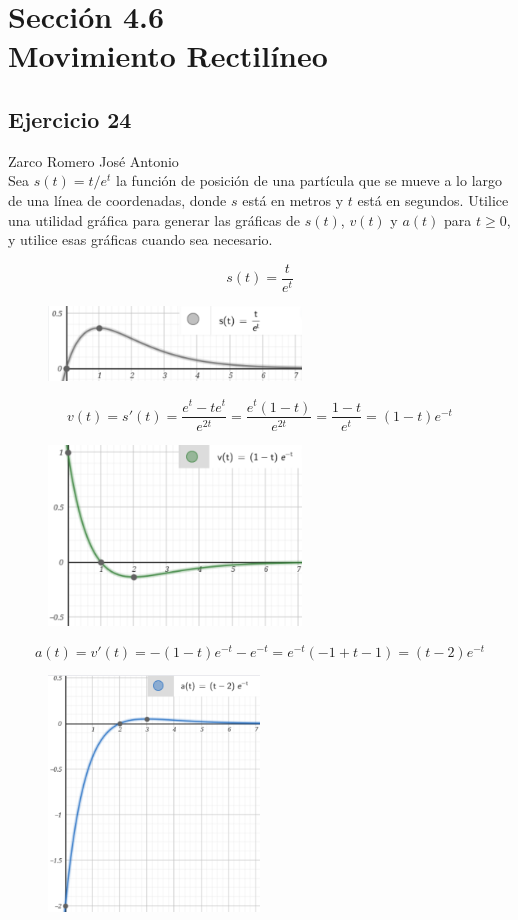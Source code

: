 \documentclass[12pt]{article}
\begin{document}
\section{Sección 4.6 \\ Movimiento Rectilíneo}
\subsection{Ejercicio 24} Zarco Romero José Antonio \\

Sea $s(t) = t /e^t$ la función de posición de una partícula que se mueve a lo largo de una línea de coordenadas, donde $s$ está en metros y $t$ está en segundos. Utilice una utilidad gráfica para generar las gráficas de $s(t)$, $v(t)$ y $a(t)$ para $t \geq 0$, y utilice esas gráficas cuando sea necesario.

\[s(t) = \frac{t}{e^t}\]
\begin{figure}[H]
\centering
\includegraphics[width=0.6\textwidth]{../img/img_Lista3/3_s.png}
\end{figure}
\[v(t)=s'(t)= \frac{e^t-te^t}{e^{2t}}=\frac{e^t(1-t)}{e^{2t}}=\frac{1-t}{e^t}=(1-t)e^{-t}\]
\begin{figure}[H]
\centering
\includegraphics[width=0.6\textwidth]{../img/img_Lista3/3_v.png}
\end{figure}
\[a(t)=v'(t)= -(1-t)e^{-t}-e^{-t}=e^{-t}(-1+t-1)=(t-2)e^{-t}\]
\begin{figure}[H]
\centering
\includegraphics[width=0.5\textwidth]{../img/img_Lista3/3_a.png}
\end{figure}
\end{document}
